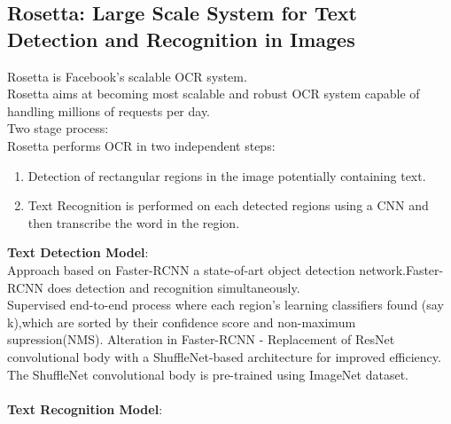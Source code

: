 \documentclass[12pt,a4paper]{article}
\begin{document}
\subsection{ Rosetta: Large Scale System for Text Detection and Recognition in Images\cite{rosettaDataset}}
Rosetta is Facebook’s scalable OCR system.\\
Rosetta aims at becoming most scalable and robust OCR system capable of handling millions of requests per day.\\Two stage process:\\
Rosetta performs OCR in two independent steps:\\
\begin{enumerate}
	\item Detection of rectangular regions in the image potentially containing text.
	\item Text Recognition is performed on each detected regions using a CNN and then transcribe the word in the region.
\end{enumerate}
\newpage
\textbf{Text Detection Model}:\\
Approach based on Faster-RCNN a state-of-art object detection network.Faster-RCNN does detection and recognition simultaneously.\\
Supervised end-to-end process where each region's learning classifiers found (say k),which are sorted by their confidence score and non-maximum supression(NMS).
Alteration in Faster-RCNN - Replacement of ResNet convolutional body with a ShuffleNet-based architecture for improved efficiency.
\\The ShuffleNet convolutional body is pre-trained using ImageNet dataset.\\~\\
\textbf{Text Recognition Model}:\\
\end{document}
